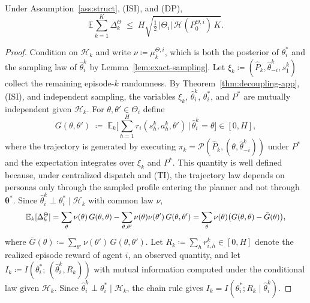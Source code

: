 \begin{lemma}
\label{lem:reward}
Under Assumption~\ref{ass:struct}, (ISI), and (DP),
\begin{equation*}
\mathbb{E}\sum_{k=1}^K \Delta_k^\Theta \;\le\; H\sqrt{\tfrac 12\, |\Theta_i|\, \mathcal H(P_0^{\Theta,i}) \, K}.
\end{equation*}
\end{lemma}

\begin{proof}
Condition on $\mathcal H_k$ and write $\nu \coloneqq \mu_k^{\Theta,i}$, which is both the posterior of $\theta_i^*$ and the sampling law of $\hat\theta_i^k$ by Lemma~\ref{lem:exact-sampling}. Let $\xi_k \coloneqq (\hat P_k, \hat\theta_{-i}^k, s_1^k)$ collect the remaining episode-$k$ randomness. By Theorem~\ref{thm:decoupling-app}, (ISI), and independent sampling, the variables $\xi_k$, $\hat\theta_i^k$, $\theta_i^*$, and $P^*$ are mutually independent given $\mathcal H_k$. For $\theta, \theta' \in \Theta_i$ define
\begin{equation*}
G(\theta, \theta') \;\coloneqq\; \mathbb{E}_k\Big[\textstyle\sum_{h=1}^H r_i(s_h^k, a_h^k, \theta') \,\Big|\, \hat\theta_i^k = \theta\Big] \in [0, H],
\end{equation*}
where the trajectory is generated by executing $\pi_k = \mathcal P(\hat P_k, (\theta, \hat\theta_{-i}^k))$ under $P^*$ and the expectation integrates over $\xi_k$ and $P^*$. This quantity is well defined because, under centralized dispatch and (TI), the trajectory law depends on personas only through the sampled profile entering the planner and not through $\boldsymbol\theta^*$. Since $\hat\theta_i^k \perp \theta_i^* \mid \mathcal H_k$ with common law $\nu$,
\begin{equation*}\resizebox{0.9\linewidth}{!}{$\displaystyle \mathbb{E}_k[\Delta_k^\Theta] = \sum_\theta \nu(\theta)\, G(\theta,\theta) - \sum_{\theta,\theta'} \nu(\theta)\nu(\theta')\, G(\theta,\theta') = \sum_\theta \nu(\theta)\big(G(\theta,\theta) - \bar G(\theta)\big), $}\end{equation*}
where $\bar G(\theta) \coloneqq \sum_{\theta'} \nu(\theta')\, G(\theta,\theta')$. Let $R_k \coloneqq \sum_{h} r_{i,h}^k \in [0,H]$ denote the realized episode reward of agent $i$, an observed quantity, and let $I_k \coloneqq I(\theta_i^*;\, (\hat\theta_i^k, R_k))$ with mutual information computed under the conditional law given $\mathcal H_k$. Since $\hat\theta_i^k \perp \theta_i^* \mid \mathcal H_k$, the chain rule gives $I_k = I(\theta_i^*; R_k \mid \hat\theta_i^k)$.


\end{proof}
